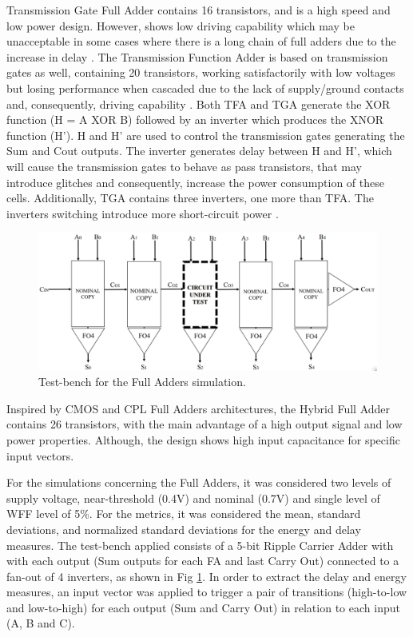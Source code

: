 \documentclass[diss,pgmicro,english]{iiufrgs}
\begin{document}
Transmission Gate Full Adder \cite{weste1985principles} contains 16 transistors, and is a high speed and low power design. However, shows low driving capability which may be unacceptable in some cases where there is a long chain of full adders due to the increase in delay \cite{islam2011design}. The Transmission Function Adder is based on transmission gates as well, containing 20 transistors, working satisfactorily with low voltages but losing performance when cascaded due to the lack of supply/ground contacts and, consequently, driving capability \cite{navi2009novel}. Both TFA and TGA generate the XOR function (H = A XOR B) followed by an inverter which produces the XNOR function (H’). H and H’ are used to control the transmission gates generating the Sum and Cout outputs. The inverter generates delay between H and H’, which will cause the transmission gates to behave as pass transistors, that may introduce glitches and consequently, increase the power consumption of these cells. Additionally, TGA contains three inverters, one more than TFA. The inverters switching introduce more short-circuit power \cite{shams2000novel}.

\begin{figure}[b]
\centering
\includegraphics[width=\textwidth, trim={0cm 0cm 0cm 0cm},clip]{testbenchFA.png}
\caption{Test-bench for the Full Adders simulation.}
\label{fig:tbFA}
\end{figure}

Inspired by CMOS and CPL Full Adders architectures, the Hybrid Full Adder \cite{navi2009novel} contains 26 transistors, with the main advantage of a high output signal and low power properties. Although, the design shows high input capacitance for specific input vectors.

For the simulations concerning the Full Adders, it was considered two levels of supply voltage, near-threshold (0.4V) and nominal (0.7V) and single level of WFF level of 5\%. For the metrics, it was considered the mean, standard deviations, and normalized standard deviations for the energy and delay measures. The test-bench applied consists of a 5-bit Ripple Carrier Adder with with each output (Sum outputs for each FA and last Carry Out) connected to a fan-out of 4 inverters, as shown in Fig \ref{fig:tbFA}. In order to extract the delay and energy measures, an input vector was applied to trigger a pair of transitions (high-to-low and low-to-high) for each output (Sum and Carry Out) in relation to each input (A, B and C).
\end{document}
